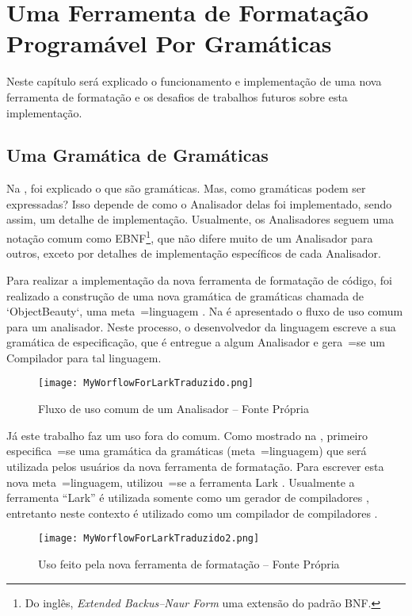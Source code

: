 

\chapter{Uma Ferramenta de Formatação Programável Por Gramáticas}
\label{software_implementation}

Neste capítulo será explicado o funcionamento e
implementação de uma nova ferramenta de formatação e
os desafios de trabalhos futuros sobre esta implementação.


\section{Uma Gramática de Gramáticas}

Na ,
foi explicado o que são gramáticas.
Mas,
como gramáticas podem ser expressadas?
Isso depende de como o Analisador delas foi implementado,
sendo assim,
um detalhe de implementação.
Usualmente,
os Analisadores seguem uma notação comum como EBNF\footnote{
Do inglês,
\textit{Extended Backus–Naur Form} uma extensão do padrão BNF.
}\cite{teachingEbnf,antlrBookTerrentParr},
que não difere muito de um Analisador para outros,
exceto por detalhes de implementação específicos de cada Analisador.

Para realizar a implementação da nova ferramenta de formatação de código,
foi realizado a construção de uma nova gramática de gramáticas chamada de `ObjectBeauty`,
uma meta~=linguagem \cite{compilersCompilerMetaLanguage}.
Na  é apresentado o fluxo de uso comum para um analisador.
Neste processo,
o desenvolvedor da linguagem escreve a sua gramática de especificação,
que é entregue a algum Analisador e
gera~=se um Compilador para tal linguagem.
\begin{figure}[h]
\centering
\texttt{[image: MyWorflowForLarkTraduzido.png]}
\caption[Fluxo de uso comum de um Analisador]{Fluxo de uso comum de um Analisador -- Fonte Própria}
\label{MyWorflowForLarkTraduzido}
\end{figure}

Já este trabalho faz um uso fora do comum.
Como mostrado na ,
primeiro especifica~=se uma gramática da gramáticas (meta~=linguagem) que será utilizada pelos usuários da nova ferramenta de formatação.
Para escrever esta nova meta~=linguagem,
utilizou~=se a ferramenta Lark \cite{larkContextualLexer}.
Usualmente a ferramenta ``Lark'' é utilizada somente como um gerador de compiladores ,
entretanto neste contexto é utilizado como um compilador de compiladores .
\begin{figure}[h]
\centering
\texttt{[image: MyWorflowForLarkTraduzido2.png]}
\caption[Uso feito pela nova ferramenta de formatação]{Uso feito pela nova ferramenta de formatação -- Fonte Própria}
\label{MyWorflowForLarkTraduzido2}
\end{figure}


